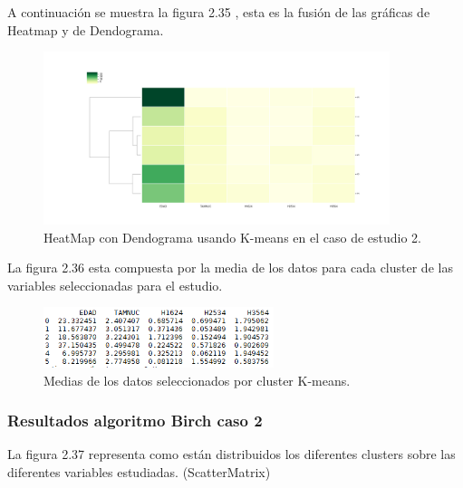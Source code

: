 	A continuación se muestra la figura 2.35 , esta es la fusión de las gráficas de 
	Heatmap y de Dendograma.  \\

	\begin{figure}[htb]
		\centering
		\includegraphics[width=0.9\textwidth]{./imagenes/caso2/heatmapcondendograma_caso2_K-means}
		\caption{HeatMap con Dendograma usando K-means en el caso de estudio 2.} \label{fig:1}
	\end{figure}

	La figura 2.36 esta compuesta por la media de los datos para cada cluster de las variables seleccionadas
	para el estudio. \\ 

	\begin{figure}[htb]
		\centering
		\includegraphics[width=0.6\textwidth]{./imagenes/caso2/medias_datos_caso2_K-means}
		\caption{Medias de los datos seleccionados por cluster K-means.} \label{fig:1}
	\end{figure}


	\subsubsection{Resultados algoritmo Birch caso 2}


	La figura 2.37 representa como están distribuidos los diferentes clusters sobre las diferentes variables estudiadas. (ScatterMatrix)\\

